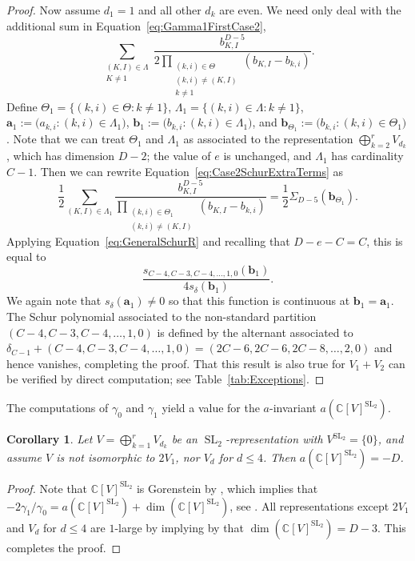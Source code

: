\documentclass{amsart}
\newtheorem{corollary}[theorem]{Corollary}
\theoremstyle{definition}
\theoremstyle{remark}
\newcommand{\C}{\mathbb{C}}
\newcommand{\SL}{\operatorname{SL}}
\newcommand{\bs}{\boldsymbol}
\begin{document}
\begin{proof}
Now assume $d_1 = 1$ and all other $d_k$ are even.
We need only deal with the additional sum in Equation~\eqref{eq:Gamma1FirstCase2},
\begin{equation}
\label{eq:Case2SchurExtraTerms}
    \sum\limits_{\substack{(K,I)\in\Lambda \\ K \neq 1}}
        \frac{ b_{K,I}^{D-5} }
            { 2 \prod\limits_{\substack{(k,i)\in\Theta \\ (k,i)\neq(K,I) \\ k\neq 1}}
                (b_{K,I}-b_{k,i})}.
\end{equation}
Define $\Theta_1 = \{(k,i)\in\Theta : k\neq 1\}$, $\Lambda_1 = \{(k,i)\in\Lambda : k\neq 1\}$,
$\bs{a}_1 := \big(a_{k,i} : (k,i)\in\Lambda_1 \big)$,
$\bs{b}_1 := \big(b_{k,i} : (k,i)\in\Lambda_1 \big)$, and $\bs{b}_{\Theta_1} := \big(b_{k,i} : (k,i)\in\Theta_1 \big)$.
Note that we can treat $\Theta_1$ and $\Lambda_1$ as associated to the representation $\bigoplus_{k=2}^r V_{d_k}$,
which has dimension $D-2$; the value of $e$ is unchanged, and $\Lambda_1$ has cardinality $C - 1$. Then we can
rewrite Equation~\eqref{eq:Case2SchurExtraTerms} as
\[
    \frac{1}{2}\sum\limits_{(K,I)\in\Lambda_1}
        \frac{ b_{K,I}^{D-5} }
            { \prod\limits_{\substack{(k,i)\in\Theta_1 \\ (k,i)\neq(K,I)}}
                (b_{K,I}-b_{k,i})}
    =
    \frac{1}{2}\Sigma_{D-5}(\bs{b}_{\Theta_1}).
\]
Applying Equation~\eqref{eq:GeneralSchurR} and recalling that $D - e - C = C$, this is equal to
\[
    \frac{ s_{C-4, C-3,C-4,\ldots, 1, 0}(\bs{b}_1) }{ 4 s_{\delta}(\bs{b}_1) }.
\]
We again note that $s_{\delta}(\bs{a}_1) \neq 0$ so that this function is continuous at
$\bs{b}_1 = \bs{a}_1$. The Schur polynomial associated to the non-standard partition
$(C-4, C-3,C-4,\ldots, 1, 0)$ is defined by the alternant associated to
$\delta_{C-1}+(C-4, C-3,C-4,\ldots, 1, 0) = (2C-6, 2C-6, 2C-8,\ldots,2,0)$ and hence
vanishes, completing the proof. That this result is also true for $V_1+V_2$ can be verified by
direct computation; see Table~\ref{tab:Exceptions}.
\end{proof}

The computations of $\gamma_0$ and $\gamma_1$ yield a value for the $a$-invariant
$a(\C[V]^{\SL_2})$.

\begin{corollary}
\label{cor:aInvar}
Let $V = \bigoplus_{k=1}^r V_{d_k}$ be an $\SL_2$-representation with $V^{\SL_2} = \{0\}$,
and assume $V$ is not isomorphic to $2V_1$, nor $V_d$ for $d \leq 4$. Then
$a(\C[V]^{\SL_2}) = -D$.
\end{corollary}
\begin{proof}
Note that $\C[V]^{\SL_2}$ is Gorenstein by \cite[Corollary 1.9]{HochsterRoberts},
which implies that $ - 2\gamma_1/\gamma_0 = a(\C[V]^{\SL_2}) + \dim(\C[V]^{\SL_2})$, see \cite[Equation (3.32)]{PopovVinberg}.
All representations except $2V_1$ and $V_d$ for $d \leq 4$  are $1$-large by
\cite[Theorem 3.4]{HerbigSchwarz} implying by
\cite[Remark (9.2)(3)]{GWSlifting} that $\dim(\C[V]^{\SL_2}) = D - 3$.
This completes the proof.
\end{proof}
\end{document}
